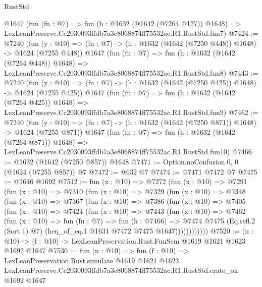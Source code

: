 \begin{lexlean}{RustStd}
\begin{coremodule}
    @1647
    (fun (fn : @7) =>
    fun (h : @1632 (@1642 (@7264 @127)) @1648) =>
    LexLeanPreserve.Cc2030093ffdb7a3e8068874ff75532ac.R1.RustStd.fun7)
@7424 := @7240
    (fun (y : @10) => (fn : @7) -> (h : @1632 (@1642 (@7250 @448)) @1648) -> @1624 (@7255 @448))
    @1647
    (fun (fn : @7) =>
    fun (h : @1632 (@1642 (@7264 @448)) @1648) =>
    LexLeanPreserve.Cc2030093ffdb7a3e8068874ff75532ac.R1.RustStd.fun8)
@7443 := @7240
    (fun (y : @10) => (fn : @7) -> (h : @1632 (@1642 (@7250 @425)) @1648) -> @1624 (@7255 @425))
    @1647
    (fun (fn : @7) =>
    fun (h : @1632 (@1642 (@7264 @425)) @1648) =>
    LexLeanPreserve.Cc2030093ffdb7a3e8068874ff75532ac.R1.RustStd.fun9)
@7462 := @7240
    (fun (y : @10) => (fn : @7) -> (h : @1632 (@1642 (@7250 @871)) @1648) -> @1624 (@7255 @871))
    @1647
    (fun (fn : @7) =>
    fun (h : @1632 (@1642 (@7264 @871)) @1648) =>
    LexLeanPreserve.Cc2030093ffdb7a3e8068874ff75532ac.R1.RustStd.fun10)
@7466 := @1632 (@1642 (@7250 @857)) @1648
@7471 := Option.noConfusion.{0, 0} (@1624 (@7255 @857)) @7
@7472 := @632 @7
@7474 := @7471 @7472 @7
@7475 := @1646 @1692
@7512 := fun (x : @10) =>
  @7272
    (fun (x : @10) =>
    @7291
      (fun (x : @10) =>
      @7310
        (fun (x : @10) =>
        @7329
          (fun (x : @10) =>
          @7348
            (fun (x : @10) =>
            @7367
              (fun (x : @10) =>
              @7386
                (fun (x : @10) =>
                @7405
                  (fun (x : @10) =>
                  @7424
                    (fun (x : @10) =>
                    @7443
                      (fun (x : @10) =>
                      @7462
                        (fun (x : @10) =>
                        fun (fn : @7) =>
                        fun (h : @7466) =>
                        @7474
                          @7475
                          (Eq.refl.{2} (Sort 1) @7)
                          (heq_of_eq.{1} @1631 @7472 @7475 @1647))))))))))))
@7520 := (n : @10) -> (f : @10) -> LexLeanPreservation.Rust.FunSem @1619 @1621 @1623 @1692 @1647
@7530 := fun (n : @10) =>
  fun (f : @10) =>
  LexLeanPreservation.Rust.simulate
    @1619
    @1621
    @1623
    LexLeanPreserve.Cc2030093ffdb7a3e8068874ff75532ac.R1.RustStd.crate_ok
    @1692
    @1647
\end{coremodule}
\end{lexlean}
